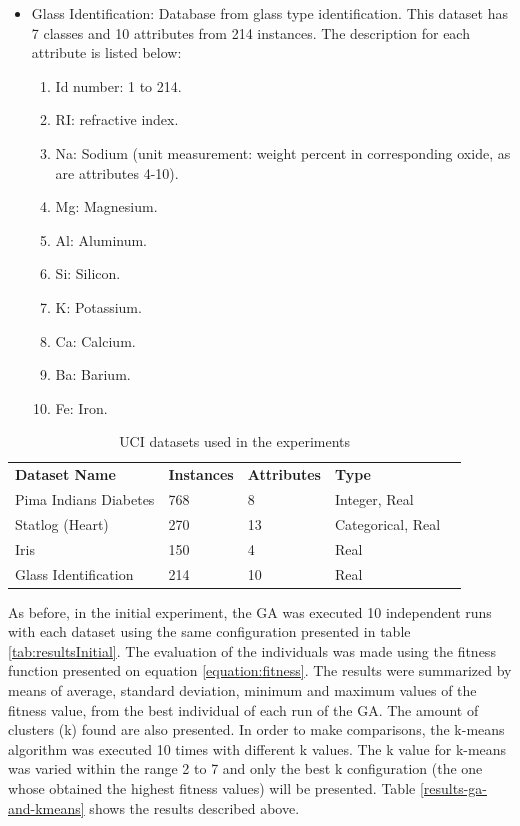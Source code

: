 \documentclass[journal]{IEEEtran}
\begin{document}
\begin{itemize}
	\item Glass Identification: Database from glass type identification. This dataset has 7 classes and 10 attributes from 214 instances. The description for each attribute is listed below:
	\begin{enumerate}
		\item Id number: 1 to 214.
		\item RI: refractive index.
		\item Na: Sodium (unit measurement: weight percent in corresponding oxide, as are attributes 4-10).
		\item Mg: Magnesium.
		\item Al: Aluminum.
		\item Si: Silicon.
		\item K: Potassium.
		\item Ca: Calcium.
		\item Ba: Barium.
		\item Fe: Iron.
	\end{enumerate}
\end{itemize}


\begin{table}[]
	\centering
	\caption{UCI datasets used in the experiments}
	\label{uci-experiments}
	\begin{tabular}{|l|l|l|l|l}
		\cline{1-4}
		\textbf{Dataset Name} & \textbf{Instances} & \textbf{Attributes} & \textbf{Type}     &  \\ \cline{1-4}
		Pima Indians Diabetes & 768                & 8                   & Integer, Real     &  \\ \cline{1-4}
		Statlog (Heart)       & 270                & 13                  & Categorical, Real &  \\ \cline{1-4}
		Iris                  & 150                & 4                   & Real              &  \\ \cline{1-4}
		Glass Identification  & 214                & 10                  & Real              &  \\ \cline{1-4}
	\end{tabular}
\end{table}


As before, in the initial experiment, the GA was executed 10 independent runs with each dataset using the same configuration presented in table \ref{tab:resultsInitial}. The evaluation of the individuals was made using the fitness function presented on equation \ref{equation:fitness}.
The results were summarized by means of average, standard deviation, minimum and maximum values of the fitness value,  from the best individual of each run of the GA. The amount of clusters (k) found are also presented.
In order to make comparisons, the k-means algorithm was executed 10 times with different k values. The k value for k-means was varied within the range 2 to 7 and only the best k configuration (the one whose obtained the highest fitness values) will be presented. Table \ref{results-ga-and-kmeans} shows the results described above. 
\end{document}
